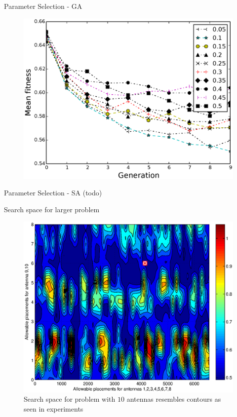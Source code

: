 \documentclass{beamer}
\begin{document}
\begin{frame}{Parameter Selection - GA}
 \begin{figure}
\centering
\vspace*{-0.4cm}
    \includegraphics[scale=0.48]{../paper/FIG/ga_mut}%
\end{figure}
\end{frame}

\begin{frame}{Parameter Selection - SA (todo)}
\end{frame}


\begin{frame}{Search space for larger problem}
 \begin{figure}
     \vspace*{-.2cm}
\centering
    \includegraphics[scale=0.5]{../paper/FIG/tc5_contour}%
    \vspace*{-.1cm}
     \caption*{\tiny Search space for problem with $10$ antennas resembles contours as seen in experiments}
\end{figure}
\end{frame}
\end{document}
